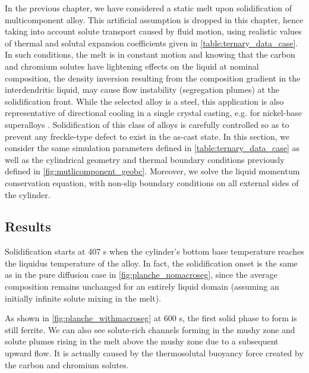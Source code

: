 In the previous chapter, we have considered a static melt upon solidification of multicomponent alloy. 
This artificial assumption is dropped in this chapter, hence taking into account solute transport 
caused by fluid motion, using realistic values of thermal and solutal expansion coefficients given in \cref{table:ternary_data_case}.
In such conditions, the melt is in constant motion and knowing that the carbon and chromium solutes have lightening effects on the liquid 
at nominal composition, the density inversion resulting from the composition gradient in the interdendritic 
liquid, may cause flow instability (segregation plumes) at the solidification front. While the selected alloy 
is a steel, this application is also representative of directional cooling in a single crystal casting, e.g. 
for nickel-base superalloys \citep{beckermann_development_2000}. Solidification of this class of alloys is carefully
controlled so as to prevent any freckle-type defect to exist in the as-cast state.
In this section, we consider the same simulation parameters defined in \cref{table:ternary_data_case} as well as the cylindrical geometry and thermal boundary conditions
previously defined in \cref{fig:mutlicomponent_geobc}. Moreover, we solve the liquid momentum conservation equation, with non-slip boundary conditions
on all external sides of the cylinder.

\subsection{Results}

Solidification starts at 407 s when the cylinder’s bottom base temperature 
reaches the liquidus temperature of the alloy. 
In fact, the solidification onset is the same as in the pure diffusion case in \cref{fig:planche_nomacroseg}, 
since the average composition remains unchanged for an entirely liquid domain (assuming an initially infinite 
solute mixing in the melt). 

As shown in \cref{fig:planche_withmacroseg} at 600 s, the first solid phase to form 
is still ferrite. We can also see solute-rich channels forming in the mushy zone and solute 
plumes rising in the melt above the mushy zone due to a subsequent upward flow. It is actually 
caused by the thermosolutal buoyancy force created by the carbon and chromium solutes. 

